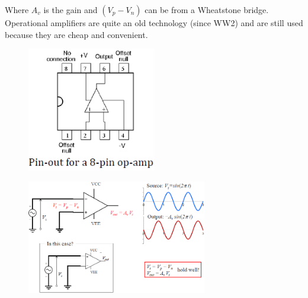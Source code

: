 \documentclass[class=report, crop=false, 12pt,a4paper]{standalone}
\begin{document}
Where $A_v$ is the gain and $(V_p - V_n)$ can be from a Wheatstone bridge. Operational amplifiers are quite an old technology (since WW2) and are still used because they are cheap and convenient.
\begin{figure}[H]
  \centering
  \includegraphics[width = 0.5\textwidth]{../img/diagram41.png}
\end{figure}
\begin{figure}[H]
  \centering
  \includegraphics[width = 0.7\textwidth]{../img/diagram42.png}
\end{figure}
\end{document}
